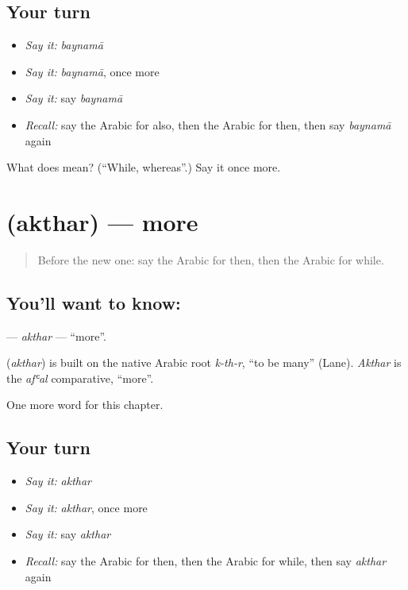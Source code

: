 \subsection*{Your turn}
\begin{itemize}
\raggedright
  \item \emph{Say it:} \emph{baynamā}
  \item \emph{Say it:} \emph{baynamā}, once more
  \item \emph{Say it:} say \emph{baynamā}
  \item \emph{Recall:} say the Arabic for also, then the Arabic for then, then say \emph{baynamā} again
\end{itemize}

\begin{tcolorbox}[breakable,colback=teal!4,colframe=teal!35!black,title={Before you move on}]
What does  mean? (\textquotedblleft{}While, whereas\textquotedblright{}.) Say it once more.
\end{tcolorbox}
\section[\texorpdfstring{\ar{أكثر} (akthar)}{أكثر (akthar)}]{ (akthar) — more}

\label{lesson:AR-C176-akthar}



\begin{quote}
Before the new one: say the Arabic for then, then the Arabic for while.
\end{quote}

\subsection*{You'll want to know: }
\textbf{} — \emph{akthar} — \textquotedblleft{}more\textquotedblright{}.

\begin{cousinweb}
\textbf{} (\emph{akthar}) is built on the native Arabic root \emph{k-th-r}, \textquotedblleft{}to be many\textquotedblright{} (Lane). \emph{Akthar} is the \emph{afʿal} comparative, \textquotedblleft{}more\textquotedblright{}.
\end{cousinweb}

\begin{grammarlens}[title={What you've built}]
One more word for this chapter.
\end{grammarlens}

\subsection*{Your turn}
\begin{itemize}
\raggedright
  \item \emph{Say it:} \emph{akthar}
  \item \emph{Say it:} \emph{akthar}, once more
  \item \emph{Say it:} say \emph{akthar}
  \item \emph{Recall:} say the Arabic for then, then the Arabic for while, then say \emph{akthar} again
\end{itemize}

